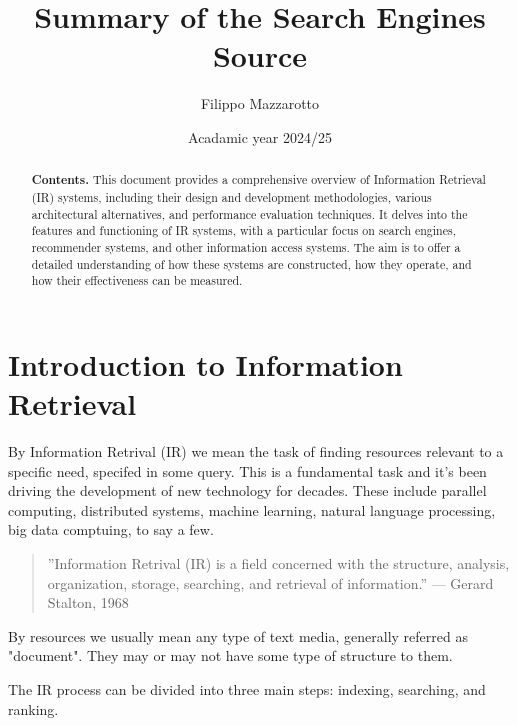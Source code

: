 \documentclass[a4paper]{tufte-handout}
\title{Summary of the Search Engines Source}
\author{Filippo Mazzarotto}
\date{Acadamic year 2024/25}
\begin{document}
\maketitle


\begin{abstract}
	\textbf{Contents.} This document provides a comprehensive overview of Information Retrieval (IR) systems, including their design and development methodologies, various architectural alternatives, and performance evaluation techniques. It delves into the features and functioning of IR systems, with a particular focus on search engines, recommender systems, and other information access systems. The aim is to offer a detailed understanding of how these systems are constructed, how they operate, and how their effectiveness can be measured.
\end{abstract}


\section{Introduction to Information Retrieval}\label{sec:introduction-to-search-engines}

By Information Retrival (IR) we mean the task of finding resources relevant to a specific need, specifed in some query. This is a fundamental task and it's been driving the development of new technology for decades. These include parallel computing, distributed systems, machine learning, natural language processing, big data comptuing, to say a few.

\begin{quote}
	''Information Retrival (IR) is a field concerned with the structure, analysis, organization, storage, searching, and retrieval of information.'' --- Gerard Stalton, 1968\cite{Salton1968}
\end{quote}

By resources we usually mean any type of text media, generally referred as "document". They may or may not have some type of structure to them. 

The IR process can be divided into three main steps: indexing, searching, and ranking.
\end{document}
